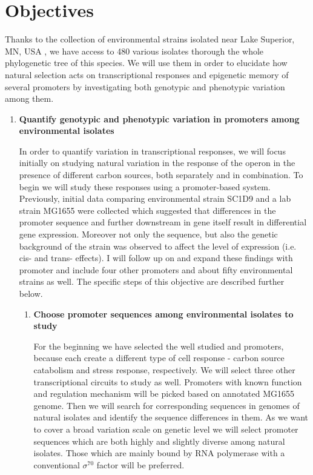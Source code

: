 \chapter*{Objectives}

\shorthandoff{-} 

Thanks to the collection of environmental  strains isolated near Lake Superior, MN, USA \cite{ishii2006presence}, we have access to 480 various isolates thorough the whole phylogenetic tree of this species.
We will use them in order to elucidate how natural selection acts on transcriptional responses and epigenetic memory of several promoters by investigating both genotypic and phenotypic variation among them.

\begin{enumerate}[font=\bfseries]

	\item \textbf{Quantify genotypic and phenotypic variation in promoters among environmental  isolates}
	
	In order to quantify variation in transcriptional responses, we will focus initially on studying natural variation in the response of the  operon in the presence of different carbon sources, both separately and in combination.
	To begin we will study these responses using a promoter-based system.
	Previously, initial data comparing environmental strain SC1\textunderscore D9 and a lab strain MG1655 were collected which suggested that differences in the  promoter sequence and further downstream in  gene itself result in differential gene expression.
	Moreover not only the sequence, but also the genetic background of the strain was observed to affect the level of expression (i.e. cis- and trans- effects).
	I will follow up on and expand these findings with  promoter and include four other promoters and about fifty environmental  strains as well.
	The specific steps of this objective are described further below.

	\begin{enumerate}[font=\bfseries]
	
		\item \textbf{Choose promoter sequences among environmental  isolates to study}
		
		For the beginning we have selected the well studied  and  promoters, because each create a different type of cell response - carbon source catabolism and stress response, respectively.
		We will select three other transcriptional circuits to study as well.
		Promoters with known function and regulation mechanism will be picked based on annotated MG1655 genome.
		Then we will search for corresponding sequences in genomes of natural isolates and identify the sequence differences in them.
		As we want to cover a broad variation scale on genetic level we will select promoter sequences which are both highly and slightly diverse among natural isolates.
		Those which are mainly bound by RNA polymerase with a conventional $\sigma^{70}$ factor will be preferred.


\end{enumerate}
\end{enumerate}
